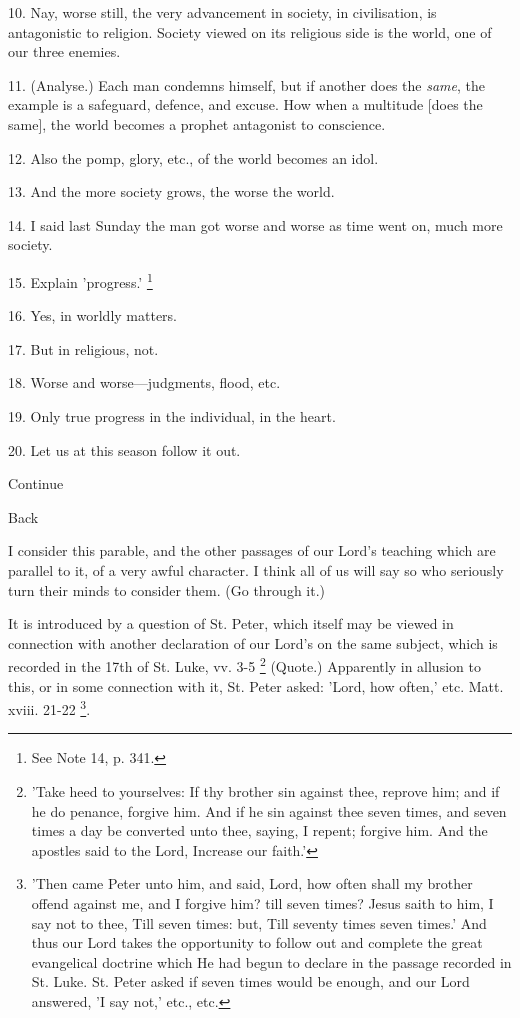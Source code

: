 10. Nay, worse still, the very advancement in
society, in civilisation, is antagonistic to religion. Society viewed
on its religious side is the world, one of our three enemies.

11. (Analyse.) Each man condemns himself, but if
another does the \emph{same}, the example is a safeguard, defence, and
excuse. How when a multitude [does the same], the world becomes a
prophet antagonist to conscience.

12. Also the pomp, glory, etc., of the world
becomes an idol.

13. And the more society grows, the worse the
world.

14. I said last Sunday the man got worse and
worse as time went on, much more society.

15. Explain 'progress.' \footnote{See Note
14, p. 341.}

16. Yes, in worldly matters.

17. But in religious, not.

18. Worse and worse—judgments, flood, etc.

19. Only true progress in the individual, in the
heart.

20. Let us at this season follow it out.

Continue

Back


I consider this parable, and the other passages
of our Lord's teaching which are parallel to it, of a very awful
character. I think all of us will say so who seriously turn their
minds to consider them. (Go through it.)

It is introduced by a question of St. Peter,
which itself may be viewed in connection with another declaration of
our Lord's on the same subject, which is recorded in the 17th of St.
Luke, vv. 3-5 \footnote{'Take heed to yourselves: If thy brother sin
against thee, reprove him; and if he do penance, forgive him. And if
he sin against thee seven times, and seven times a day be converted
unto thee, saying, I repent; forgive him. And the apostles said to the
Lord, Increase our faith.'} (Quote.)
Apparently in allusion to this, or in some connection with it, St.
Peter asked: 'Lord, how often,' etc. Matt. xviii. 21-22 \footnote{'Then came Peter unto him,
and said, Lord, how often shall my brother offend against me, and I
forgive him? till seven times? Jesus saith to him, I say not to thee,
Till seven times: but, Till seventy times seven times.' And thus our
Lord takes the opportunity to follow out and complete the great
evangelical doctrine which He had begun to declare in the passage
recorded in St. Luke. St. Peter asked if seven times would be enough,
and our Lord answered, 'I say not,' etc., etc.}.


